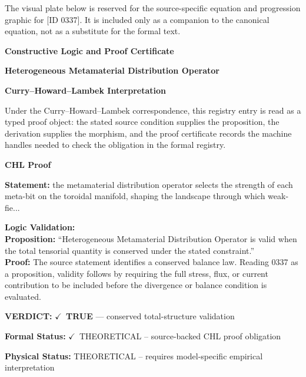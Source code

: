 \begingroup\footnotesize\sloppy
The visual plate below is reserved for the source-specific equation and progression graphic for [ID 0337]. It is included only as a companion to the canonical equation, not as a substitute for the formal text.
\par\endgroup
\ifTZPDarkEdition
{}
\fi

\clearpage
\begingroup\tzpsupportsetup
\noindent\textbf{\fontsize{10.8pt}{12.8pt}\selectfont [ID 0337] Constructive Logic and Proof Certificate}\par
\noindent\textbf{\fontsize{10pt}{12pt}\selectfont Heterogeneous Metamaterial Distribution Operator}\par
\vspace{0.45em}
\begingroup
\footnotesize
\setlength{\parskip}{0.22em}
\setlength{\parindent}{0pt}
\noindent\textbf{Curry--Howard--Lambek Interpretation}\par
Under the Curry--Howard--Lambek correspondence, this registry entry is read as a typed proof
object: the stated source condition supplies the proposition, the derivation supplies the
morphism, and the proof certificate records the machine handles needed to check the obligation
in the formal registry.

\vspace{0.45em}
\noindent\textbf{CHL Proof}\par
\textbf{Statement:} the metamaterial distribution operator selects the strength of each meta-bit on the
toroidal manifold, shaping the landscape through which weak-fie...

\textbf{Logic Validation:}\\
\textbf{Proposition:} ``Heterogeneous Metamaterial Distribution Operator is valid when the total tensorial
quantity is conserved under the stated constraint.''\\
\textbf{Proof:} The source statement identifies a conserved balance law. Reading 0337 as a proposition,
validity follows by requiring the full stress, flux, or current contribution to be
included before the divergence or balance condition is evaluated.

\textbf{VERDICT:} \ensuremath{\checkmark}\ \textbf{TRUE} --- conserved total-structure validation

\textbf{Formal Status:} \ensuremath{\checkmark}\ THEORETICAL -- source-backed CHL proof obligation

\textbf{Physical Status:} THEORETICAL -- requires model-specific empirical interpretation
\par\vspace{0.45em}
\par
\ifTZPDarkEdition
{}
\fi
\endgroup
\endgroup
